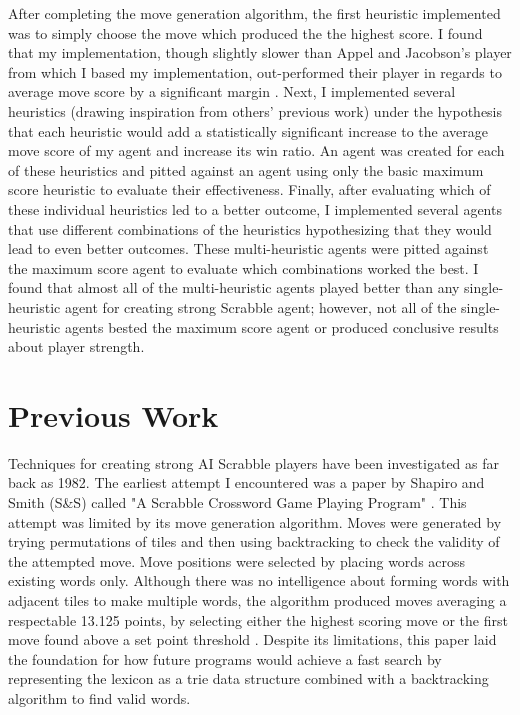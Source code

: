 \documentclass[letterpaper]{article}
\begin{document}
After completing the move generation algorithm, the first heuristic implemented was to simply choose the move which produced the the highest score. I found that my implementation, though slightly slower than Appel and Jacobson's player from which I based my implementation, out-performed their player in regards to average move score by a significant margin \cite{Appel1988}. Next, I implemented several heuristics (drawing inspiration from others' previous work) under the hypothesis that each heuristic would add a statistically significant increase to the average move score of my agent and increase its win ratio. An agent was created for each of these heuristics and pitted against an agent using only the basic maximum score heuristic to evaluate their effectiveness. Finally, after evaluating which of these individual heuristics led to a better outcome, I implemented several agents that use different combinations of the heuristics hypothesizing that they would lead to even better outcomes. These multi-heuristic agents were pitted against the maximum score agent to evaluate which combinations worked the best. I found that almost all of the multi-heuristic agents played better than any single-heuristic agent for creating strong Scrabble agent; however, not all of the single-heuristic agents bested the maximum score agent or produced conclusive results about player strength.

\section{Previous Work}
Techniques for creating strong AI Scrabble players have been investigated as far back as 1982. The earliest attempt I encountered was a paper by Shapiro and Smith (S\&S) called "A Scrabble Crossword Game Playing Program" \cite{Shapiro1982}. This attempt was limited by its move generation algorithm. Moves were generated by trying permutations of tiles and then using backtracking to check the validity of the attempted move. Move positions were selected by placing words across existing words only. Although there was no intelligence about forming words with adjacent tiles to make multiple words, the algorithm produced moves averaging a respectable 13.125 points, by selecting either the highest scoring move or the first move found above a set point threshold \cite{Shapiro1982}. Despite its limitations, this paper laid the foundation for how future programs would achieve a fast search by representing the lexicon as a trie data structure combined with a backtracking algorithm to find valid words.
\end{document}
